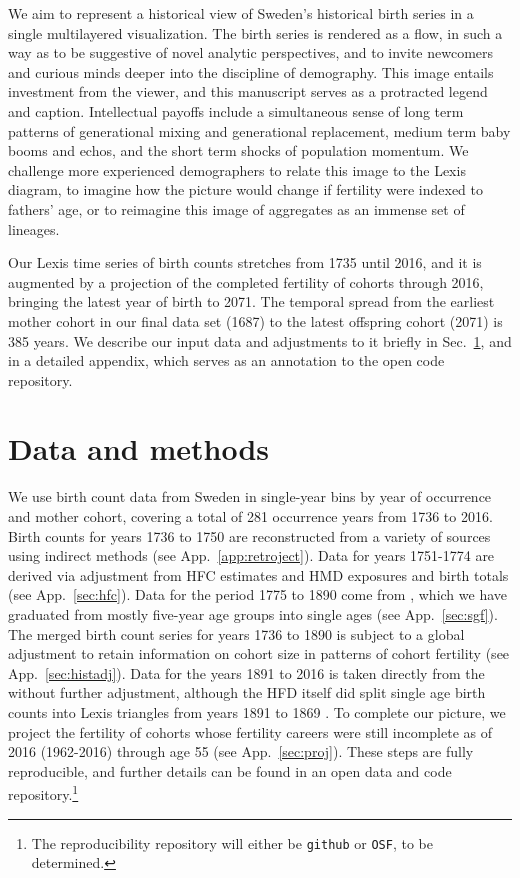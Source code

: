 \documentclass{article}
\begin{document}
We aim to represent a historical view of Sweden's historical birth series in a single multilayered visualization. The birth series is rendered as a flow, in such a way as to be suggestive of novel analytic perspectives, and to invite newcomers and curious minds deeper into the discipline of demography. This image entails investment from the viewer, and this manuscript serves as a protracted legend and caption. Intellectual payoffs include a simultaneous sense of long term patterns of generational mixing and generational replacement, medium term baby booms and echos, and the short term shocks of population momentum. We challenge more experienced demographers to relate this image to the Lexis diagram, to imagine how the picture would change if fertility were indexed to fathers' age, or to reimagine this image of aggregates as an immense set of lineages.

Our Lexis time series of birth counts stretches from 1735 until 2016, and it is augmented by a projection of the completed fertility of cohorts through 2016, bringing the latest year of birth to 2071. The temporal spread from the earliest mother cohort in our final data set (1687) to the latest offspring cohort (2071) is 385 years. We describe our input data and adjustments to it briefly in Sec.~\ref{sec:data}, and in a detailed appendix, which serves as an annotation to the open code repository.

\section{Data and methods}
\label{sec:data}
We use birth count data from Sweden in single-year bins by year of occurrence and mother cohort, covering a total of 281 occurrence years from 1736 to 2016. Birth counts for years 1736 to 1750 are reconstructed from a variety of sources \citep{HFC, HMD, sweden1969historisk} using indirect methods (see App.~\ref{app:retroject}). Data for years 1751-1774 are derived via adjustment from HFC estimates and HMD exposures and birth totals (see App.~\ref{sec:hfc}). Data for the period 1775 to 1890 come from \citet{sgf1907}, which we have graduated from mostly five-year age groups into single ages (see App.~\ref{sec:sgf}). The merged birth count series for years 1736 to 1890 is subject to a global adjustment to retain information on cohort size in patterns of cohort fertility (see App.~\ref{sec:histadj}). Data for the years 1891 to 2016 is taken directly from the \citet{HFD} without further adjustment, although the HFD itself did split single age birth counts into Lexis triangles from years 1891 to 1869 \citep{persson2010human}. To complete our picture, we project the fertility of cohorts whose fertility careers were still incomplete as of 2016 (1962-2016) through age 55 (see App.~\ref{sec:proj}). These steps are fully reproducible, and further details can be found in an open data and code repository.\footnote{The reproducibility repository will either be \texttt{github} or \texttt{OSF}, to be determined.}
\end{document}
